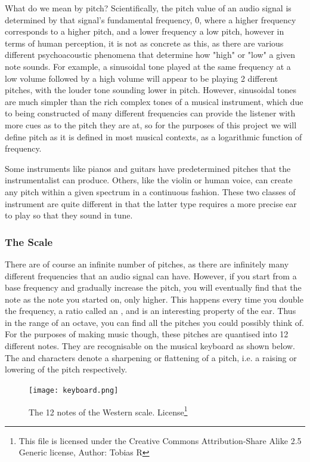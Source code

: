 	\par What do we mean by pitch? Scientifically, the pitch value of an audio signal is determined by that signal's fundamental frequency, \f0, where a higher frequency corresponds to a higher pitch, and a lower frequency a low pitch, however in terms of human perception, it is not as concrete as this, as there are various different psychoacoustic phenomena that determine how "high" or "low" a given note sounds. For example, a sinusoidal tone played at the same frequency at a low volume followed by a high volume will appear to be playing 2 different pitches, with the louder tone sounding lower in pitch. However, sinusoidal tones are much simpler than the rich complex tones of a musical instrument, which due to being constructed of many different frequencies can provide the listener with more cues as to the pitch they are at, so for the purposes of this project we will define pitch as it is defined in most musical contexts, as a logarithmic function of frequency.	
	
	\par Some instruments like pianos and guitars have predetermined pitches that the instrumentalist can produce. Others, like the violin or human voice, can create any pitch within a given spectrum in a continuous fashion. These two classes of instrument are quite different in that the latter type requires a more precise ear to play so that they sound in tune.
	
	\subsubsection{The Scale}
	There are of course an infinite number of pitches, as there are infinitely many different frequencies that an audio signal can have. However, if you start from a base frequency and gradually increase the pitch, you will eventually find that the note  as the note you started on, only higher. This happens every time you double the frequency, a ratio called an , and is an interesting property of the ear. Thus in the range of an octave, you can find all the pitches you could possibly think of. For the purposes of making music though, these pitches are quantised into 12 different notes. They are recognisable on the musical keyboard as shown below. The \bsq{\#} and  characters denote a sharpening or flattening of a pitch, i.e. a raising or lowering of the pitch respectively.
	
	\begin{figure}[h]
		\centering
		\texttt{[image: keyboard.png]}
		\caption[Caption]{The 12 notes of the Western scale. License\footnote{This file is licensed under the Creative Commons Attribution-Share Alike 2.5 Generic license, Author: Tobias R}}
	\end{figure}
	
